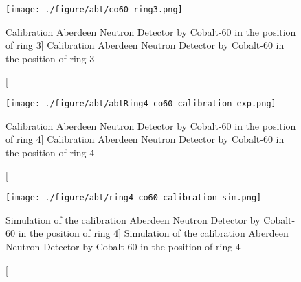 \begin{figure}
    \centering
    \texttt{[image: ./figure/abt/co60\_ring3.png]}
    \caption
    [Calibration Aberdeen Neutron Detector by Cobalt-60 in the position of ring 3]
    {Calibration Aberdeen Neutron Detector by Cobalt-60 in the position of ring 3}
    \label{fig:co60_ring3.png}
    \end{figure}






\begin{figure}
    \centering
    \texttt{[image: ./figure/abt/abtRing4\_co60\_calibration\_exp.png]}
    \caption
    [Calibration Aberdeen Neutron Detector by Cobalt-60 in the position of ring 4]
    {Calibration Aberdeen Neutron Detector by Cobalt-60 in the position of ring 4}
    \label{fig:abtRing4_co60_calibration_exp.png}
    \end{figure}



\begin{figure}
    \centering
    \texttt{[image: ./figure/abt/ring4\_co60\_calibration\_sim.png]}
    \caption
    [Simulation of the calibration Aberdeen Neutron Detector by Cobalt-60 in the position of ring 4]
    {Simulation of the calibration Aberdeen Neutron Detector by Cobalt-60 in the position of ring 4}
    \label{fig:ring4_co60_calibration_sim.png}
    \end{figure}
